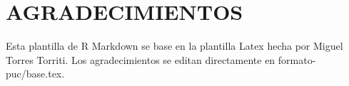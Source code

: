 \documentclass[12pt,reqno,oneside,pdftex]{formato-puc/puctesis} %
\begin{document}



\chapter*{AGRADECIMIENTOS}
Esta plantilla de R Markdown se base en la plantilla Latex hecha por
Miguel Torres Torriti. Los agradecimientos se editan directamente en formato-puc/base.tex.
\par


\cleardoublepage %



\tableofcontents
\listoffigures          
\listoftables           
\cleardoublepage %


\end{document}
